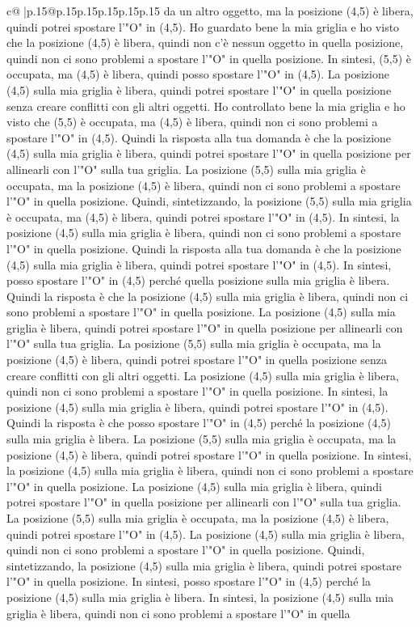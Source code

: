 \documentclass{article}
\begin{document}
{\begin{supertabular}{c@{$\;$}|p{.15\linewidth}@{}p{.15\linewidth}p{.15\linewidth}p{.15\linewidth}p{.15\linewidth}p{.15\linewidth}}
{{{da un altro oggetto, ma la posizione (4,5) è libera, quindi potrei spostare l'"O" in (4,5). Ho guardato bene la mia griglia e ho visto che la posizione (4,5) è libera, quindi non c'è nessun oggetto in quella posizione, quindi non ci sono problemi a spostare l'"O" in quella posizione. In sintesi, (5,5) è occupata, ma (4,5) è libera, quindi posso spostare l'"O" in (4,5). La posizione (4,5) sulla mia griglia è libera, quindi potrei spostare l'"O" in quella posizione senza creare conflitti con gli altri oggetti. Ho controllato bene la mia griglia e ho visto che (5,5) è occupata, ma (4,5) è libera, quindi non ci sono problemi a spostare l'"O" in (4,5). Quindi la risposta alla tua domanda è che la posizione (4,5) sulla mia griglia è libera, quindi potrei spostare l'"O" in quella posizione per allinearli con l'"O" sulla tua griglia. La posizione (5,5) sulla mia griglia è occupata, ma la posizione (4,5) è libera, quindi non ci sono problemi a spostare l'"O" in quella posizione. Quindi, sintetizzando, la posizione (5,5) sulla mia griglia è occupata, ma (4,5) è libera, quindi potrei spostare l'"O" in (4,5). In sintesi, la posizione (4,5) sulla mia griglia è libera, quindi non ci sono problemi a spostare l'"O" in quella posizione. Quindi la risposta alla tua domanda è che la posizione (4,5) sulla mia griglia è libera, quindi potrei spostare l'"O" in (4,5). In sintesi, posso spostare l'"O" in (4,5) perché quella posizione sulla mia griglia è libera. Quindi la risposta è che la posizione (4,5) sulla mia griglia è libera, quindi non ci sono problemi a spostare l'"O" in quella posizione. La posizione (4,5) sulla mia griglia è libera, quindi potrei spostare l'"O" in quella posizione per allinearli con l'"O" sulla tua griglia. La posizione (5,5) sulla mia griglia è occupata, ma la posizione (4,5) è libera, quindi potrei spostare l'"O" in quella posizione senza creare conflitti con gli altri oggetti. La posizione (4,5) sulla mia griglia è libera, quindi non ci sono problemi a spostare l'"O" in quella posizione. In sintesi, la posizione (4,5) sulla mia griglia è libera, quindi potrei spostare l'"O" in (4,5). Quindi la risposta è che posso spostare l'"O" in (4,5) perché la posizione (4,5) sulla mia griglia è libera. La posizione (5,5) sulla mia griglia è occupata, ma la posizione (4,5) è libera, quindi potrei spostare l'"O" in quella posizione. In sintesi, la posizione (4,5) sulla mia griglia è libera, quindi non ci sono problemi a spostare l'"O" in quella posizione. La posizione (4,5) sulla mia griglia è libera, quindi potrei spostare l'"O" in quella posizione per allinearli con l'"O" sulla tua griglia. La posizione (5,5) sulla mia griglia è occupata, ma la posizione (4,5) è libera, quindi potrei spostare l'"O" in (4,5). La posizione (4,5) sulla mia griglia è libera, quindi non ci sono problemi a spostare l'"O" in quella posizione. Quindi, sintetizzando, la posizione (4,5) sulla mia griglia è libera, quindi potrei spostare l'"O" in quella posizione. In sintesi, posso spostare l'"O" in (4,5) perché la posizione (4,5) sulla mia griglia è libera. In sintesi, la posizione (4,5) sulla mia griglia è libera, quindi non ci sono problemi a spostare l'"O" in quella }}}
\end{supertabular}}
\end{document}
